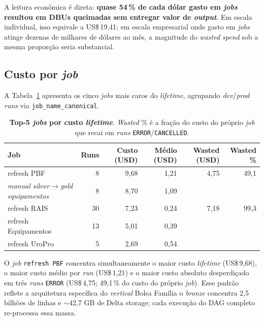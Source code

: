 \documentclass[12pt,a4paper,oneside]{article}
\newcommand{\us}{US\$\,}
\begin{document}
A leitura econômica é direta: \textbf{quase 54\,\% de cada dólar
gasto em \textit{jobs} resultou em DBUs queimadas sem entregar valor
de \textit{output}}. Em escala individual, isso equivale a
\us 19{,}41; em escala empresarial onde gasto em \textit{jobs}
atinge dezenas de milhares de dólares ao mês, a magnitude do
\textit{wasted spend} sob a mesma proporção seria substancial.

\subsection{Custo por \textit{job}}

A Tabela~\ref{tab:byjob} apresenta os cinco \textit{jobs} mais
caros do \textit{lifetime}, agrupando \textit{dev}/\textit{prod}
\textit{runs} via \texttt{job\_name\_canonical}.

\begin{table}[H]
\centering
\caption{\textbf{Top-5 \textit{jobs} por custo \textit{lifetime}}.
        \textit{Wasted} \% é a fração do custo do próprio \textit{job}
        que recai em \textit{runs} \texttt{ERROR}/\texttt{CANCELLED}.}
\label{tab:byjob}
\small
\begin{tabular}{lrrrrr}
\toprule
\textbf{Job}                            & \textbf{Runs} & \textbf{Custo (USD)} & \textbf{Médio (USD)} & \textbf{Wasted (USD)} & \textbf{Wasted \%} \\
\midrule
refresh PBF                             & 8             & 9,68                 & 1,21                  & 4,75                  & 49,1 \\
\textit{manual silver}\(\to\)\textit{gold equipamentos} & 8 & 8,70    & 1,09                  & \textemdash{}          & \textemdash{} \\
refresh RAIS                            & 30            & 7,23                 & 0,24                  & 7,18                  & 99,3 \\
refresh Equipamentos                    & 13            & 5,01                 & 0,39                  & \textemdash{}          & \textemdash{} \\
refresh UroPro                          & \phantom{0}5   & 2,69                & 0,54                  & \textemdash{}          & \textemdash{} \\
\bottomrule
\end{tabular}
\end{table}

O \textit{job} \texttt{refresh PBF} concentra simultaneamente o
maior custo \textit{lifetime} (\us 9{,}68), o maior custo médio por
\textit{run} (\us 1{,}21) e o maior custo absoluto desperdiçado em
três \textit{runs} \texttt{ERROR} (\us 4{,}75; 49,1\,\% do custo do
próprio \textit{job}). Esse padrão reflete a arquitetura específica
do \textit{vertical} Bolsa Família \textemdash{} o \textit{bronze}
concentra 2,5 bilhões de linhas e \(\sim\)42,7 GB de Delta storage;
cada execução do DAG completo re-processa essa massa.
\end{document}
